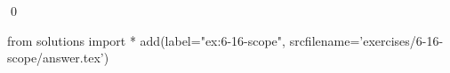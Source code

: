 
\begin{ex}
  \label{ex:6-16-scope}
  
  \qed
\end{ex}
\begin{python0}
from solutions import *
add(label="ex:6-16-scope",
    srcfilename='exercises/6-16-scope/answer.tex')
\end{python0}
